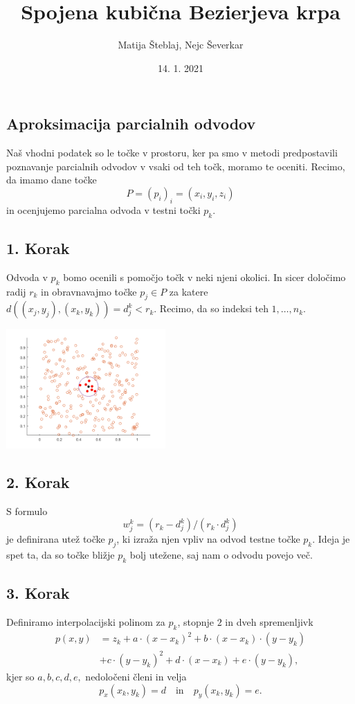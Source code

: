 \documentclass[ignorenonframetext]{beamer}
\title{Spojena kubična Bezierjeva krpa}
\author{Matija Šteblaj, Nejc Ševerkar}
\date{14. 1. 2021}
\let\frametitle\subsection %
\begin{document}
\begin{frame}
\titlepage
\end{frame}

\begin{frame}
\frametitle{Aproksimacija parcialnih odvodov}

Naš vhodni podatek so le točke v prostoru, ker pa smo v metodi predpostavili 
poznavanje parcialnih odvodov v vsaki od teh točk, moramo te oceniti.
\vspace{10px}
Recimo, da imamo dane točke
$$P = (p_i)_i = (x_i,y_i,z_i)$$
in ocenjujemo parcialna odvoda v testni točki $p_k$.
\end{frame}

\begin{frame}
\frametitle{1. Korak}
Odvoda v $p_k$ bomo ocenili s pomočjo točk v neki njeni okolici. 
In sicer določimo radij $r_k$ in obravnavajmo točke $p_j \in P$ za katere $d((x_j,y_j), (x_k,y_k)) = d^k_j < r_k$.
Recimo, da so indeksi teh $1,\dots, n_k$.
\begin{center}
	\includegraphics[width=230px]{slike/pointRadius.png}
\end{center}
\end{frame}

\begin{frame}
\frametitle{2. Korak}
S formulo 
$$w^k_j = (r_k - d^k_j) / (r_k \cdot d^k_j)$$
je definirana utež točke $p_j$, ki izraža njen vpliv na odvod testne točke $p_k$.
Ideja je spet ta, da so točke bližje $p_k$ bolj utežene, saj nam o odvodu povejo več.
\end{frame}

\begin{frame}
\frametitle{3. Korak}
Definiramo interpolacijski polinom za $p_k$, stopnje $2$ in dveh spremenljivk
\begin{equation*}
\begin{aligned}
p(x,y) &= z_k + a \cdot (x - x_k)^2 + b \cdot (x - x_k) \cdot (y - y_k) \\
&+ c \cdot (y - y_k)^2 + d \cdot (x-x_k) + e\cdot(y-y_k),
\end{aligned}
\end{equation*}
kjer so $a,b,c,d,e,$ nedoločeni členi in velja 
$$p_x(x_k,y_k) = d \quad \text{in} \quad p_y(x_k,y_k) = e.$$
\end{frame}
\end{document}
